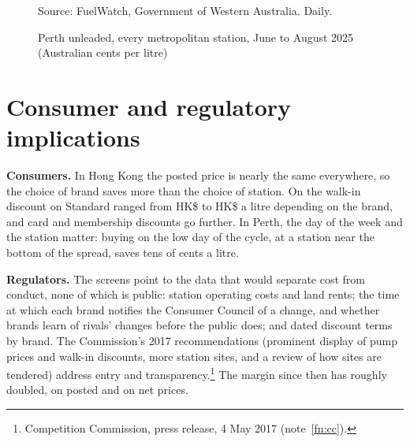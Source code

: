 \documentclass[11pt]{article}
\newcommand{\hk}{HK\$}
\begin{document}
\begin{figure}[H]
\centering
\caption{Perth unleaded, every metropolitan station, June to August 2025 (Australian cents per litre)}
\label{fig:perth}
\par\footnotesize Source: FuelWatch, Government of Western Australia. Daily.
\end{figure}

\section{Consumer and regulatory implications}

\textbf{Consumers.} In Hong Kong the posted price is nearly the same everywhere, so the choice of brand saves more than the choice of station. On \essayDiscDate{} the walk-in discount on Standard ranged from \hk\essayDiscLow{} to \hk\essayDiscHigh{} a litre depending on the brand, and card and membership discounts go further. In Perth, the day of the week and the station matter: buying on the low day of the cycle, at a station near the bottom of the spread, saves tens of cents a litre.

\textbf{Regulators.} The screens point to the data that would separate cost from conduct, none of which is public: station operating costs and land rents; the time at which each brand notifies the Consumer Council of a change, and whether brands learn of rivals' changes before the public does; and dated discount terms by brand. The Commission's 2017 recommendations (prominent display of pump prices and walk-in discounts, more station sites, and a review of how sites are tendered) address entry and transparency.\footnote{Competition Commission, press release, 4 May 2017 (note~\ref{fn:cc}).} The margin since then has roughly doubled, on posted and on net prices.
\end{document}
